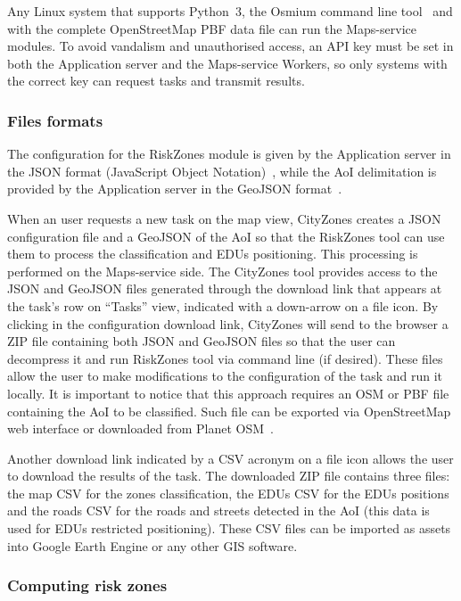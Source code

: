 \begin{refsection}
Any Linux system that supports Python~3, the Osmium command line tool~\cite{osmium} and with the complete OpenStreetMap PBF data file can run the Maps-service modules. To avoid vandalism and unauthorised access, an API key must be set in both the Application server and the Maps-service Workers, so only systems with the correct key can request tasks and transmit results.

\subsubsection{Files formats}

The configuration for the RiskZones module is given by the Application server in the JSON format (JavaScript Object Notation)~\cite{json}, while the AoI delimitation is provided by the Application server in the GeoJSON format~\cite{geojson}.

When an user requests a new task on the map view, CityZones creates a JSON configuration file and a GeoJSON of the AoI so that the RiskZones tool can use them to process the classification and EDUs positioning. This processing is performed on the Maps-service side. The CityZones tool provides access to the JSON and GeoJSON files generated through the download link that appears at the task's row on ``Tasks'' view, indicated with a down-arrow on a file icon. By clicking in the configuration download link, CityZones will send to the browser a ZIP file containing both JSON and GeoJSON files so that the user can decompress it and run RiskZones tool via command line (if desired). These files allow the user to make modifications to the configuration of the task and run it locally. It is important to notice that this approach requires an OSM or PBF file containing the AoI to be classified. Such file can be exported via OpenStreetMap web interface or downloaded from Planet OSM~\cite{planetosm}.

Another download link indicated by a CSV acronym on a file icon allows the user to download the results of the task. The downloaded ZIP file contains three files: the map CSV for the zones classification, the EDUs CSV for the EDUs positions and the roads CSV for the roads and streets detected in the AoI (this data is used for EDUs restricted positioning). These CSV files can be imported as assets into Google Earth Engine or any other GIS software.

\subsubsection{Computing risk zones}


\end{refsection}
